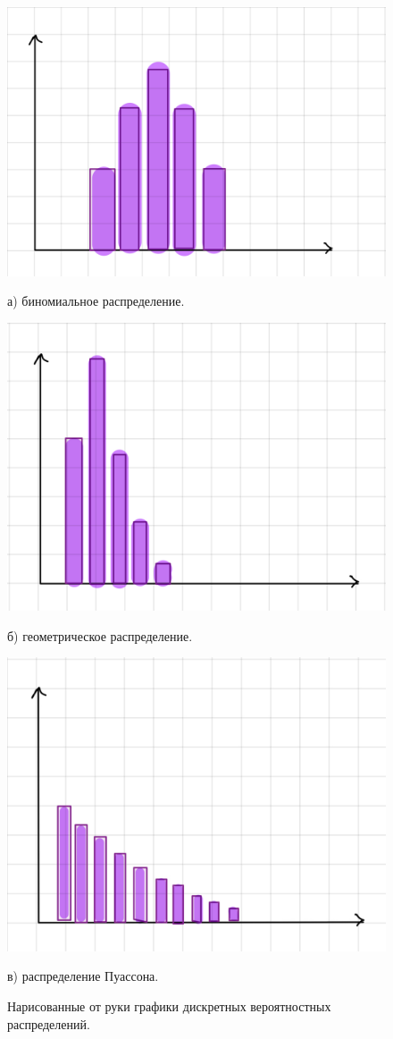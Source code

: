 \documentclass[14pt, russian]{scrartcl}
\begin{document}
\begin{figure}[H]
	\centering
	\begin{minipage}[t]{.35\textwidth}
		\centering
		\includegraphics[width=0.7\linewidth]{./img/binom_2.jpg}
		\caption*{а) биномиальное распределение.}
	\end{minipage}
	\noindent
	\begin{minipage}[t]{.35\textwidth}
		\centering
		\includegraphics[width=0.7\linewidth]{./img/geom_2.jpg}
		\caption*{б) геометрическое распределение.}
	\end{minipage}
	\begin{minipage}[t]{.35\textwidth}
		\centering
		\includegraphics[width=0.7\linewidth]{./img/poisson_2.jpg}
		\caption*{в) распределение Пуассона.}
	\end{minipage}
	\caption{Нарисованные от руки графики дискретных вероятностных распределений.}
	\label{fig:hand1}
\end{figure}
\end{document}
